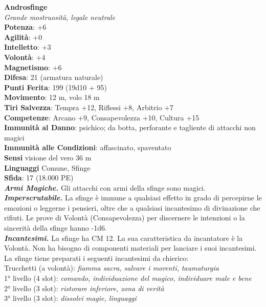 \begin{multicols}{2}
\medskip\textbf{Androsfinge}\\
\emph{Grande mostruosità, legale neutrale}\\
\textbf{Potenza}: +6\\
\textbf{Agilità}: +0\\
\textbf{Intelletto}: +3\\
\textbf{Volontà}: +4\\
\textbf{Magnetismo}: +6\\
\textbf{Difesa}: 21 (armatura naturale)\\
\textbf{Punti Ferita}: 199 (19d10 + 95)\\
\textbf{Movimento}: 12 m, volo 18 m\\
\textbf{Tiri Salvezza}: Tempra +12, Riflessi +8, Arbitrio +7\\
\textbf{Competenze}: Arcano +9, Consapevolezza +10, Cultura +15\\
\textbf{Immunità al Danno}: psichico; da botta, perforante e tagliente di attacchi non magici\\
\textbf{Immunità alle Condizioni}: affascinato, spaventato\\
\textbf{Sensi} visione del vero 36 m\\
\textbf{Linguaggi} Comune, Sfinge\\
\textbf{Sfida}: 17 (18.000 PE)\smallskip\\
\emph{\textbf{Armi Magiche.}} Gli attacchi con armi della sfinge sono magici.\\
\emph{\textbf{Imperscrutabile.}} La sfinge è immune a qualsiasi effetto in grado di percepirne le emozioni o leggerne i pensieri, oltre che a qualsiasi incantesimo di divinazione che rifiuti. Le prove di Volontà (Consapevolezza) per discernere le intenzioni o la sincerità della sfinge hanno -1d6.\\
\emph{\textbf{Incantesimi.}} La sfinge ha CM 12. La sua caratteristica da incantatore è la Volontà. Non ha bisogno di componenti materiali per lanciare i suoi incantesimi. La sfinge tiene preparati i seguenti incantesimi da chierico:\\
Trucchetti (a volontà): \emph{fiamma sacra, salvare i morenti,} \emph{taumaturgia}\\
1° livello (4 slot): \emph{comando, individuazione del magico,} \emph{individuare male e bene}\\
2° livello (3 slot): \emph{ristorare inferiore, zona di verità}\\
3° livello (3 slot): \emph{dissolvi magie, linguaggi}\\

\end{multicols}

